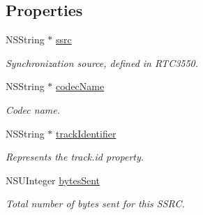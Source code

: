 \subsection*{Properties}
\begin{DoxyCompactItemize}
\item 
\mbox{\label{interface_c_c_audio_sender_status_ade52887ba4ef4c186cd474c8fcf8caae}} 
N\+S\+String $\ast$ \hyperlink{interface_c_c_audio_sender_status_ade52887ba4ef4c186cd474c8fcf8caae}{ssrc}
\begin{DoxyCompactList}\small\item\em Synchronization source, defined in R\+T\+C3550. \end{DoxyCompactList}\item 
\mbox{\label{interface_c_c_audio_sender_status_a8495dec93379cf8448e601dc5febe5b2}} 
N\+S\+String $\ast$ \hyperlink{interface_c_c_audio_sender_status_a8495dec93379cf8448e601dc5febe5b2}{codec\+Name}
\begin{DoxyCompactList}\small\item\em Codec name. \end{DoxyCompactList}\item 
\mbox{\label{interface_c_c_audio_sender_status_adee78790ea9194b6c49e2b3b71517c32}} 
N\+S\+String $\ast$ \hyperlink{interface_c_c_audio_sender_status_adee78790ea9194b6c49e2b3b71517c32}{track\+Identifier}
\begin{DoxyCompactList}\small\item\em Represents the track.\+id property. \end{DoxyCompactList}\item 
\mbox{\label{interface_c_c_audio_sender_status_a7aa70df4c5bb053ea58f88650f9dc1de}} 
N\+S\+U\+Integer \hyperlink{interface_c_c_audio_sender_status_a7aa70df4c5bb053ea58f88650f9dc1de}{bytes\+Sent}
\begin{DoxyCompactList}\small\item\em Total number of bytes sent for this S\+S\+RC. \end{DoxyCompactList}\item 
\mbox{\label{interface_c_c_audio_sender_status_a9e9866fce7dea5689a3ddaa27f112ffb}} 

\end{DoxyCompactItemize}
